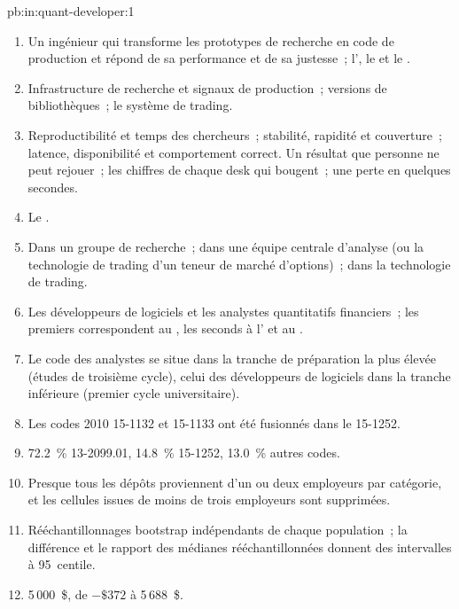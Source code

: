 \begin{solution}{pb:in:quant-developer:1}
\begin{enumerate}
\item Un ingénieur qui transforme les prototypes de recherche en code de production et répond de sa performance et de sa justesse~;
l', le  et le .
\item Infrastructure de recherche et signaux de production~; versions de bibliothèques~; le système de trading.
\item Reproductibilité et temps des chercheurs~; stabilité, rapidité et couverture~; latence, disponibilité et comportement correct. Un résultat
que personne ne peut rejouer~; les chiffres de chaque desk qui bougent~; une perte en quelques secondes.
\item Le .
\item Dans un groupe de recherche~; dans une équipe centrale d'analyse (ou la technologie de trading d'un teneur de marché d'options)~;
dans la technologie de trading.
\item Les développeurs de logiciels et les analystes quantitatifs financiers~; les premiers correspondent au , les seconds
à l' et au .
\item Le code des analystes se situe dans la tranche de préparation la plus élevée (études de troisième cycle), celui des développeurs de logiciels dans la tranche
inférieure (premier cycle universitaire).
\item Les codes 2010 15-1132 et 15-1133 ont été fusionnés dans le 15-1252.
\item 72.2~\% 13-2099.01, 14.8~\% 15-1252, 13.0~\% autres codes.
\item Presque tous les dépôts proviennent d'un ou deux employeurs par catégorie, et les cellules issues de moins de trois employeurs
sont supprimées.
\item Rééchantillonnages bootstrap indépendants de chaque population~; la différence et le rapport des médianes rééchantillonnées donnent des intervalles à
95~centile.
\item 5\,000~\$, de $-\$372$ à 5\,688~\$.

\end{enumerate}
\end{solution}
